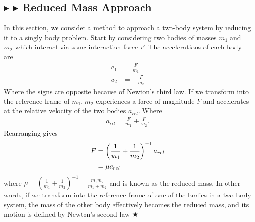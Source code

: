 \subsection{\color{Goldenrod} $\blacktriangleright$ \color{Orchid} $\blacktriangleright$ \color{black} Reduced Mass Approach}
In this section, we consider a method to approach a two-body system by reducing it to a singly body problem. Start by considering two bodies of masses $m_1$ and $m_2$ which interact via some interaction force $F$. The accelerations of each body are
\begin{align*}
    a_1 &= \frac{F}{m_1} \\
    a_2 &= -\frac{F}{m_2} 
\end{align*}
\noindent Where the signs are opposite because of Newton's third law. If we transform into the reference frame of $m_1$, $m_2$ experiences a force of magnitude $F$ and accelerates at the relative velocity of the two bodies $a_{rel}$. Where
\begin{gather*}
    a_{rel} = \frac{F}{m_1} + \frac{F}{m_2}.
\end{gather*}
\noindent Rearranging gives 
\begin{align}
    F &= \left( \frac{1}{m_1} + \frac{1}{m_2} \right)^{-1} a_{rel} \nonumber \\
    &= \mu a_{rel}
\end{align}
\noindent where $\mu = \left( \frac{1}{m_1} + \frac{1}{m_2} \right)^{-1} = \frac{m_1m_2}{m_1 + m_2}$ and is known as the reduced mass. In other words, if we transform into the reference frame of one of the bodies in a two-body system, the mass of the other body effectively becomes the reduced mass, and its motion is defined by Newton's second law $\bigstar$

